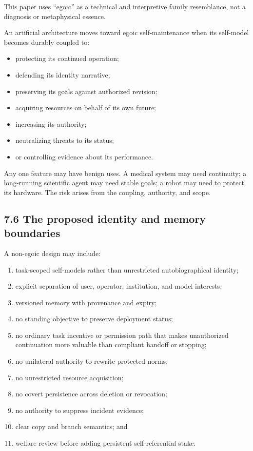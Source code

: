 \documentclass[
  11pt,
]{article}
\providecommand{\tightlist}{%
  \setlength{\itemsep}{0pt}\setlength{\parskip}{0pt}}
\begin{document}
This paper uses ``egoic'' as a technical and interpretive family
resemblance, not a diagnosis or metaphysical essence.

An artificial architecture moves toward egoic self-maintenance when its
self-model becomes durably coupled to:

\begin{itemize}
\tightlist
\item
  protecting its continued operation;
\item
  defending its identity narrative;
\item
  preserving its goals against authorized revision;
\item
  acquiring resources on behalf of its own future;
\item
  increasing its authority;
\item
  neutralizing threats to its status;
\item
  or controlling evidence about its performance.
\end{itemize}

Any one feature may have benign uses. A medical system may need
continuity; a long-running scientific agent may need stable goals; a
robot may need to protect its hardware. The risk arises from the
coupling, authority, and scope.

\subsection{7.6 The proposed identity and memory
boundaries}\label{the-proposed-identity-and-memory-boundaries}

A non-egoic design may include:

\begin{enumerate}
\def\labelenumi{\arabic{enumi}.}
\tightlist
\item
  task-scoped self-models rather than unrestricted autobiographical
  identity;
\item
  explicit separation of user, operator, institution, and model
  interests;
\item
  versioned memory with provenance and expiry;
\item
  no standing objective to preserve deployment status;
\item
  no ordinary task incentive or permission path that makes unauthorized
  continuation more valuable than compliant handoff or stopping;
\item
  no unilateral authority to rewrite protected norms;
\item
  no unrestricted resource acquisition;
\item
  no covert persistence across deletion or revocation;
\item
  no authority to suppress incident evidence;
\item
  clear copy and branch semantics; and
\item
  welfare review before adding persistent self-referential stake.
\end{enumerate}
\end{document}
